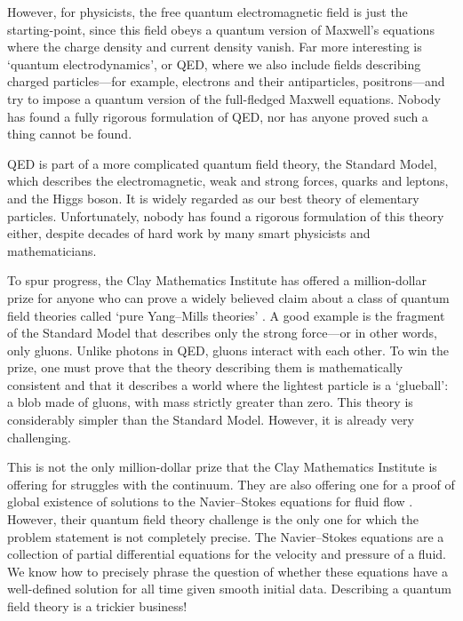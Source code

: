 \documentclass[12pt]{article}
\begin{document}
However, for physicists, the free quantum electromagnetic field is just the starting-point, since this field obeys a quantum version of Maxwell's equations where the charge density and current density vanish.   Far more interesting is `quantum electrodynamics', or QED, where we also include fields describing charged particles---for example, electrons and their antiparticles,  positrons---and try to impose a quantum version of the full-fledged Maxwell equations. Nobody has found a fully rigorous formulation of QED, nor has anyone proved such a thing cannot be found.

QED is part of a more complicated quantum field theory, the Standard Model, which describes the electromagnetic, weak and strong forces, quarks and leptons, and the Higgs boson.  It is widely regarded as our best theory of elementary particles.  Unfortunately, nobody has found a rigorous formulation of this theory either, despite decades of hard work by many smart physicists and mathematicians.

To spur progress, the Clay Mathematics Institute has offered a million-dollar prize for anyone who can prove a widely believed claim about a class of quantum field theories called `pure Yang--Mills theories' \cite{ClayYM}.  A good example is the fragment of the Standard Model that describes only the strong force---or in other words, only gluons.  Unlike photons in QED, gluons interact with each other.  To win the prize, one must prove that the theory describing them is mathematically consistent and that it describes a world where the lightest particle is a `glueball': a blob made of gluons, with mass strictly greater than zero.  This theory is considerably simpler than the Standard Model.  However, it is already very challenging.

This is not the only million-dollar prize that the Clay Mathematics Institute is offering for struggles with the continuum.  They are also offering one for a proof of global existence of solutions to the Navier--Stokes equations for fluid flow \cite{ClayNS}.  However, their quantum field theory challenge is the only one for which the problem statement is not completely precise.  The Navier--Stokes equations are a collection of partial differential equations for the velocity and pressure of a fluid.  We know how to precisely phrase the question of whether these equations have a well-defined solution for all time given smooth initial data.  Describing a quantum field theory is a trickier business!
\end{document}
